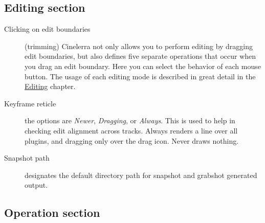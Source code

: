 \subsection{Editing section}%
\label{sub:editing_section}

\begin{description}
    \item[Clicking on edit boundaries] (trimming) Cinelerra not only allows you to perform editing by dragging edit boundaries, but also defines five separate operations that occur when you drag an edit boundary. Here you can select the behavior of each mouse button. The usage of each editing mode is described in great detail in the \hyperref[sub:drag_handle_management_trimming]{Editing} chapter.
    \item[Keyframe reticle] the options are \textit{Newer}, \textit{Dragging}, or \textit{Always}. This is used to help in checking edit alignment across tracks.  Always renders a line over all plugins, and dragging only over the drag icon. Never draws nothing.
    \item[Snapshot path] designates the default directory path for snapshot and grabshot generated output.
\end{description}

\subsection{Operation section}%
\label{sub:operation_section}

